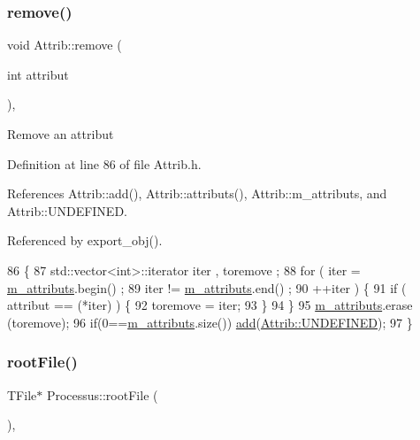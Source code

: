 \subsubsection{\texorpdfstring{remove()}{remove()}}
{\footnotesize\ttfamily void Attrib\+::remove (\begin{DoxyParamCaption}\item[{int}]{attribut }\end{DoxyParamCaption})\hspace{0.3cm}{\ttfamily [inline]}, {\ttfamily [inherited]}}

Remove an attribut 

Definition at line 86 of file Attrib.\+h.



References Attrib\+::add(), Attrib\+::attributs(), Attrib\+::m\+\_\+attributs, and Attrib\+::\+U\+N\+D\+E\+F\+I\+N\+ED.



Referenced by export\+\_\+obj().


\begin{DoxyCode}
86                                \{
87     std::vector<int>::iterator iter , toremove ;
88     \textcolor{keywordflow}{for} ( iter  = \hyperlink{classAttrib_ac4bd58a0cc6b38a3b711d609a3d3aacc}{m\_attributs}.begin() ;
89           iter != \hyperlink{classAttrib_ac4bd58a0cc6b38a3b711d609a3d3aacc}{m\_attributs}.end()   ;
90           ++iter ) \{
91       \textcolor{keywordflow}{if} ( attribut == (*iter) ) \{
92         toremove = iter;
93       \}
94     \}
95     \hyperlink{classAttrib_ac4bd58a0cc6b38a3b711d609a3d3aacc}{m\_attributs}.erase (toremove);
96     \textcolor{keywordflow}{if}(0==\hyperlink{classAttrib_ac4bd58a0cc6b38a3b711d609a3d3aacc}{m\_attributs}.size()) \hyperlink{classAttrib_a235f773af19c900264a190b00a3b4ad7}{add}(\hyperlink{classAttrib_a69e171d7cc6417835a5a306d3c764235a3a8da2ab97dda18aebab196fe4100531}{Attrib::UNDEFINED});
97   \}
\end{DoxyCode}
\mbox{\label{classProcessus_a247e8c362ec08422cf53d08dd23b093c}} 
\subsubsection{\texorpdfstring{root\+File()}{rootFile()}}
{\footnotesize\ttfamily T\+File$\ast$ Processus\+::root\+File (\begin{DoxyParamCaption}{ }\end{DoxyParamCaption})\hspace{0.3cm}{\ttfamily [inline]}, {\ttfamily [inherited]}}

